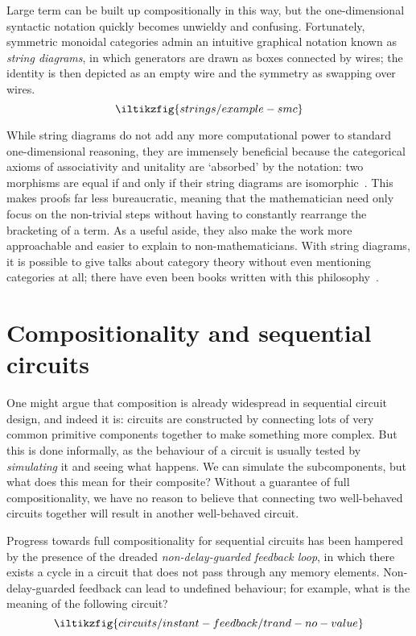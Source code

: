Large term can be built up compositionally in this way, but the one-dimensional
syntactic notation quickly becomes unwieldy and confusing.
Fortunately, symmetric monoidal categories admin an intuitive graphical notation
known as \emph{string diagrams}, in which generators are drawn as boxes connected
by wires; the identity is then depicted as an empty wire and the symmetry as
swapping over wires.
\[
    \iltikzfig{strings/example-smc}
\]

While string diagrams do not add any more computational power to
standard one-dimensional reasoning, they are
immensely beneficial because the categorical axioms of associativity and
unitality are `absorbed' by the notation: two morphisms are equal if and only if
their string diagrams are isomorphic~\cite{kelly1980coherence,kissinger2014abstract}.
This makes proofs far less bureaucratic, meaning that the mathematician need
only focus on the non-trivial steps without having to constantly rearrange the
bracketing of a term.
As a useful aside, they also make the work more approachable and easier to
explain to non-mathematicians.
With string diagrams, it is possible to give talks about category theory without
even mentioning categories at all; there have even been books written with this
philosophy~\cite{coecke2018picturing}.



\section{Compositionality and sequential circuits}

One might argue that composition is already widespread in sequential circuit
design, and indeed it is: circuits are constructed by connecting lots of very
common primitive components together to make something more complex.
But this is done informally, as the behaviour of a circuit is usually tested
by \emph{simulating} it and seeing what happens.
We can simulate the subcomponents, but what does this mean for their composite?
Without a guarantee of full compositionality, we have no reason to
believe that connecting two well-behaved circuits together will result in
another well-behaved circuit.

Progress towards full compositionality for sequential circuits has been hampered
by the presence of the dreaded \emph{non-delay-guarded feedback loop}, in which
there exists a cycle in a circuit that does not pass through any memory elements.
Non-delay-guarded feedback can lead to undefined behaviour; for example, what is
the meaning of the following circuit?
\[
    \iltikzfig{circuits/instant-feedback/trand-no-value}
\]

